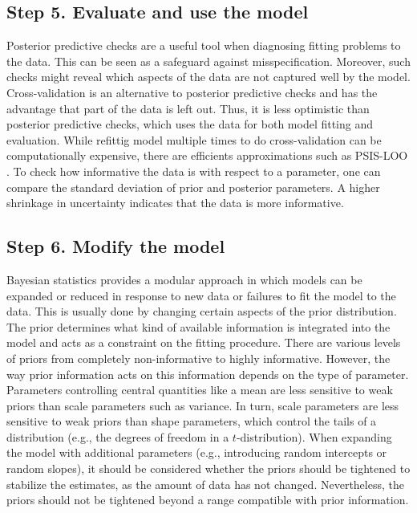 \subsection{Step 5. Evaluate and use the model}

Posterior predictive checks are a useful tool when diagnosing fitting problems to the data.
This can be seen as a safeguard against misspecification.
Moreover, such checks might reveal which aspects of the data are not captured well by the model.
Cross-validation is an alternative to posterior predictive checks and has the advantage that part of the data is left out.
Thus, it is less optimistic than posterior predictive checks, which uses the data for both model fitting and evaluation.
While refittig model multiple times to do cross-validation can be computationally expensive, there are efficients approximations such as PSIS-LOO \citep{vehtari_practical_2017}.
To check how informative the data is with respect to a parameter, one can compare the standard deviation of prior and posterior parameters. A higher shrinkage in uncertainty indicates that the data is more informative.

\subsection{Step 6. Modify the model}

Bayesian statistics provides a modular approach in which models can be expanded or reduced in response to new data or failures to fit the model to the data.
This is usually done by changing certain aspects of the prior distribution.
The prior determines what kind of available information is integrated into the model and acts as a constraint on the fitting procedure.
There are various levels of priors from completely non-informative to highly informative.
However, the way prior information acts on this information depends on the type of parameter.
Parameters controlling central quantities like a mean are less sensitive to weak priors than scale parameters such as variance.
In turn, scale parameters are less sensitive to weak priors than shape parameters, which control the tails of a distribution (e.g., the degrees of freedom in a $t$-distribution).
When expanding the model with additional parameters (e.g., introducing random intercepts or random slopes), it should be considered whether the priors should be tightened to stabilize the estimates, as the amount of data has not changed.
Nevertheless, the priors should not be tightened beyond a range compatible with prior information.


